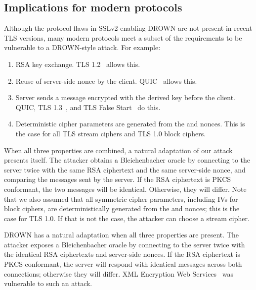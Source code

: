 \subsection{Implications for modern protocols}
Although the protocol flaws in SSLv2 enabling DROWN are not present in recent TLS versions, many modern protocols meet a subset of the requirements to be vulnerable to a DROWN-style attack. For example:
\begin{enumerate}
	\item RSA key exchange. TLS 1.2~\cite{rfc5246} allows this.
	\item Reuse of server-side nonce by the client. QUIC~\cite{quic-langley-2014} allows this.
	\item Server sends a message encrypted with the derived key before the client. QUIC, TLS 1.3~\cite{TLS1_3}, and TLS False Start~\cite{FalseStart} do this.
	\item Deterministic cipher parameters are generated from the \pms and nonces. This is the case for all TLS stream ciphers and TLS 1.0 block ciphers.
\end{enumerate}

When all three properties are combined, a natural adaptation of our attack presents itself.
The attacker obtains a Bleichenbacher oracle by connecting to the server twice with the same RSA ciphertext and the same server-side nonce, and comparing the messages sent by the server.
If the RSA ciphertext is PKCS conformant, the two messages will be identical.
Otherwise, they will differ.
Note that we also assumed that all symmetric cipher parameters, including IVs for block ciphers, are deterministically generated from the \pms and nonces; this is the case for TLS 1.0.
If that is not the case, the attacker can choose a stream cipher.
\fi

DROWN has a natural adaptation when all three properties are present. The attacker exposes a Bleichenbacher oracle by connecting to the server twice with the identical RSA ciphertexts and server-side nonces. If the RSA ciphertext is PKCS conformant, the server will respond with identical messages across both connections; otherwise they will differ.
\ifext
XML Encryption Web Services~\cite{Jager2012} was vulnerable to such an
attack.
\fi


